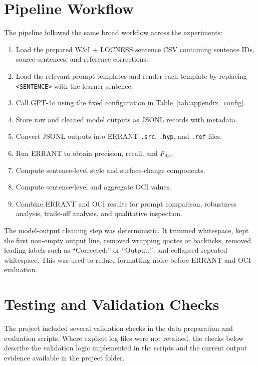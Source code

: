 \section{Pipeline Workflow}
\label{app:pipeline-workflow}

The pipeline followed the same broad workflow across the experiments:
\begin{enumerate}
    \item Load the prepared W\&I + LOCNESS sentence CSV containing sentence IDs, source sentences, and reference corrections.
    \item Load the relevant prompt templates and render each template by replacing \texttt{<SENTENCE>} with the learner sentence.
    \item Call GPT-4o using the fixed configuration in Table~\ref{tab:appendix_config}.
    \item Store raw and cleaned model outputs as JSONL records with metadata.
    \item Convert JSONL outputs into ERRANT \texttt{.src}, \texttt{.hyp}, and \texttt{.ref} files.
    \item Run ERRANT to obtain precision, recall, and $F_{0.5}$.
    \item Compute sentence-level style and surface-change components.
    \item Compute sentence-level and aggregate OCI values.
    \item Combine ERRANT and OCI results for prompt comparison, robustness analysis, trade-off analysis, and qualitative inspection.
\end{enumerate}

The model-output cleaning step was deterministic. It trimmed whitespace, kept the first non-empty output line, removed wrapping quotes or backticks, removed leading labels such as ``Corrected:'' or ``Output:'', and collapsed repeated whitespace. This was used to reduce formatting noise before ERRANT and OCI evaluation.

\section{Testing and Validation Checks}
\label{app:testing-validation}

The project included several validation checks in the data preparation and evaluation scripts. Where explicit log files were not retained, the checks below describe the validation logic implemented in the scripts and the current output evidence available in the project folder.


